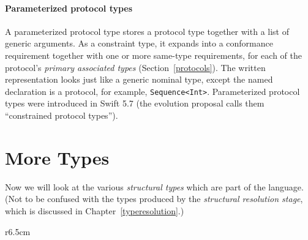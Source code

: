 \documentclass[../generics]{subfiles}
\begin{document}
\paragraph{Parameterized protocol types}
A parameterized protocol type stores a protocol type together with a list of generic arguments. As a constraint type, it expands into a conformance requirement together with one or more same-type requirements, for each of the protocol's \emph{primary associated types} (Section~\ref{protocols}). The written representation looks just like a generic nominal type, except the named declaration is a protocol, for example, \texttt{Sequence<Int>}. Parameterized protocol types were introduced in Swift 5.7 \cite{se0346} (the evolution proposal calls them ``constrained protocol types'').

\section{More Types}\label{more types}

Now we will look at the various \emph{structural types} which are part of the language. (Not to be confused with the types produced by the \emph{structural resolution stage}, which is discussed in Chapter~\ref{typeresolution}.)

\begin{wrapfigure}[15]{r}{6.5cm}
\begin{center}
\end{center}
\end{wrapfigure}
\end{document}
